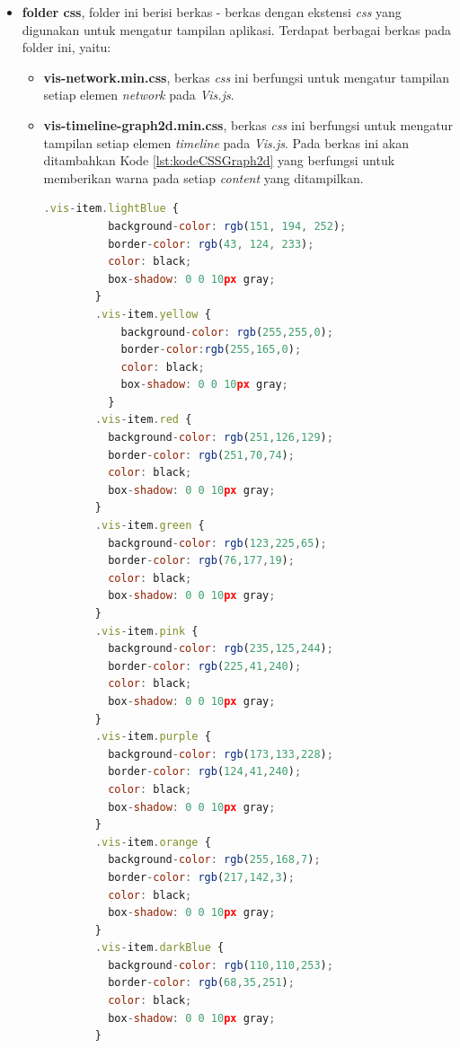 \begin{itemize}
    \item \textbf{folder css}, folder ini berisi berkas - berkas dengan ekstensi \textit{css} yang digunakan untuk mengatur tampilan aplikasi. Terdapat berbagai berkas pada folder ini, yaitu:
    \begin{itemize}
        \item \textbf{vis-network.min.css}, berkas \textit{css} ini berfungsi untuk mengatur tampilan setiap elemen \textit{network} pada \textit{Vis.js}.
        \item \textbf{vis-timeline-graph2d.min.css},
        berkas \textit{css} ini berfungsi untuk mengatur tampilan setiap elemen \textit{timeline} pada \textit{Vis.js}.
        Pada berkas ini akan ditambahkan Kode \ref{lst:kodeCSSGraph2d} yang berfungsi untuk memberikan warna pada setiap \textit{content} yang ditampilkan.
        
        \begin{lstlisting}[language=JavaScript, caption=Tambahan kode \textit{vis-timeline-graph2d.min.css}\label{lst:kodeCSSGraph2d}]
        .vis-item.lightBlue {
          background-color: rgb(151, 194, 252);
          border-color: rgb(43, 124, 233);
          color: black;
          box-shadow: 0 0 10px gray;
        }
        .vis-item.yellow {
            background-color: rgb(255,255,0);
            border-color:rgb(255,165,0);
            color: black;
            box-shadow: 0 0 10px gray;
          }
        .vis-item.red {
          background-color: rgb(251,126,129);
          border-color: rgb(251,70,74);
          color: black;
          box-shadow: 0 0 10px gray;
        }
        .vis-item.green {
          background-color: rgb(123,225,65);
          border-color: rgb(76,177,19);
          color: black;
          box-shadow: 0 0 10px gray;
        }
        .vis-item.pink {
          background-color: rgb(235,125,244);
          border-color: rgb(225,41,240);
          color: black;
          box-shadow: 0 0 10px gray;
        }
        .vis-item.purple {
          background-color: rgb(173,133,228);
          border-color: rgb(124,41,240);
          color: black;
          box-shadow: 0 0 10px gray;
        }
        .vis-item.orange {
          background-color: rgb(255,168,7);
          border-color: rgb(217,142,3);
          color: black;
          box-shadow: 0 0 10px gray;
        }
        .vis-item.darkBlue {
          background-color: rgb(110,110,253);
          border-color: rgb(68,35,251);
          color: black;
          box-shadow: 0 0 10px gray;
        }
        \end{lstlisting}
        

\end{itemize}
\end{itemize}
